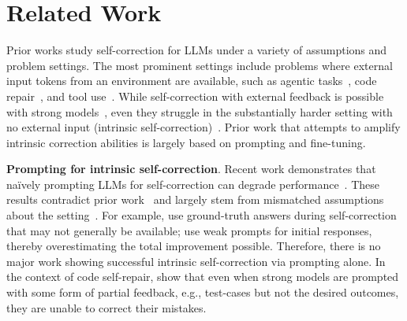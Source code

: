 \vspace{-0.2cm}
\section{Related Work}
\vspace{-0.2cm}
Prior works study self-correction for LLMs under a variety of assumptions and problem settings. The most prominent settings include problems where external input tokens from an environment are available, such as agentic tasks~\citep{liu2023agentbench}, code repair~\citep{jain2024livecodebench}, and tool use~\citep{chen2023teaching}. While self-correction with external feedback is possible with strong models~\citep{pan2023automatically}, even they struggle in the substantially harder setting with no external input (intrinsic self-correction)~\citep{kamoi2024can,huang2023large}. Prior work that attempts to amplify intrinsic correction abilities is largely based on prompting and fine-tuning.

\textbf{Prompting for intrinsic self-correction}. Recent work demonstrates that na\"ively prompting LLMs for self-correction can degrade performance~\citep{huang2023large, zheng2024natural, tyen2024llms,qu2024recursive}. These results contradict prior work~\citep{madaan2023self,shinn2023reflexion,kim2023language} and largely stem from mismatched assumptions about the setting~\citep{kamoi2024can}. For example, \citet{shinn2023reflexion, kim2023language} use ground-truth answers during self-correction that may not generally be available; \citet{madaan2023self} use weak prompts for initial responses, thereby overestimating the total improvement possible.  Therefore, there is no major work showing successful intrinsic self-correction via prompting alone. In the context of code self-repair, \cite{olausson2023self} show that even when strong models are prompted with some form of partial feedback, e.g., test-cases but not the desired outcomes, they are unable to correct their mistakes. 


